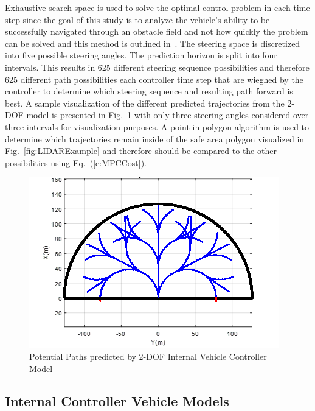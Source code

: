 \documentclass[12pt,twocolumn]{article}
\begin{document}
Exhaustive search space is used to solve the optimal control problem in each time step since the goal of this study is to analyze the vehicle's ability to be successfully navigated through an obstacle field and not how quickly the problem can be solved and this method is outlined in~\cite{ModelFidelity2016}. The steering space is discretized into five possible steering angles. The prediction horizon is split into four intervals. This results in 625 different steering sequence possibilities and therefore 625 different path possibilities each controller time step that are wieghed by the controller to determine which steering sequence and resulting path forward is best. A sample visualization of the different predicted trajectories from the 2-DOF model is presented in Fig.~\ref{fig:PossiblePaths}  with only three steering angles considered over three intervals for visualization purposes. A point in polygon algorithm is used to determine which trajectories remain inside of the safe area polygon visualized in Fig.~\ref{fig:LIDARExample} and therefore should be compared to the other possibilities using Eq.~(\ref{e:MPCCost}).

\begin{figure}
	\centering
	\includegraphics[width=\columnwidth]{Figs/PathPossibilities.png}
	\caption{\small Potential Paths predicted by 2-DOF Internal Vehicle Controller Model}  
	\label{fig:PossiblePaths}
\end{figure}


\subsection{Internal Controller Vehicle Models}\label{ss:IntModel}
\end{document}
